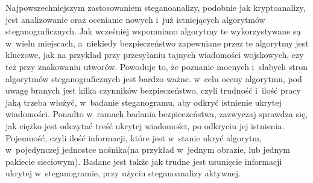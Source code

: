 \documentclass[a4paper, twoside, 12pt]{report}
\begin{document}
        Najpowszechniejszym zastosowaniem steganoanalizy, podobnie jak kryptoanalizy,
        jest analizowanie oraz ocenianie nowych i~już istniejących algorytmów steganograficznych.
        Jak wcześniej wspomniano algorytmy te wykorzystywane są w~wielu miejscach,
        a~niekiedy bezpieczeństwo zapewniane przez te algorytmy jest kluczowe, jak
        na przykład przy przesyłaniu tajnych wiadomości wojskowych, czy też przy znakowaniu
        utworów. Powoduje to, że poznanie mocnych i~słabych stron algorytmów steganograficznych
        jest bardzo ważne. w~celu oceny algorytmu, pod uwagę branych jest kilka czynników
        bezpieczeństwo, czyli trudność i~ilość pracy jaką trzeba włożyć,
        w~badanie steganogramu, aby odkryć istnienie ukrytej wiadomości.
        Ponadto w~ramach badania bezpieczeństwa, zazwyczaj sprawdza się, jak ciężko
        jest odczytać treść ukrytej wiadomości, po odkryciu jej istnienia.
        Pojemność, czyli
        ilość informacji, które jest w~stanie ukryć algorytm, w~pojedynczej jednostce
        nośnika(na przykład w~jednym obrazie, lub jednym pakiecie sieciowym). Badane
        jest także jak trudne jest usunięcie informacji ukrytej w~steganogramie, przy
        użyciu steganoanalizy aktywnej.
\end{document}
